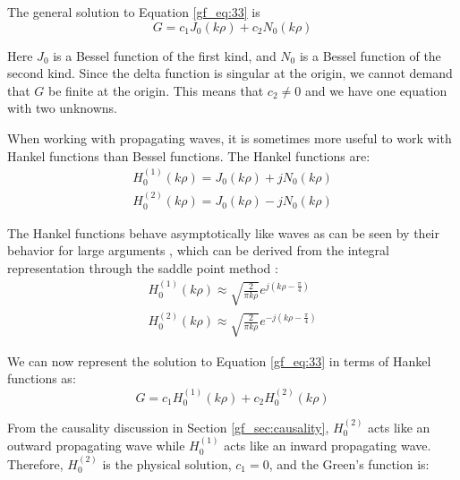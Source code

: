 \noindent The general solution to Equation \ref{gf_eq:33} is 
\begin{equation}
G = c_1J_0\left(k\rho\right) + c_2N_0\left(k\rho\right)
\label{gf_eq:35}
\end{equation}
\renewcommand{\baselinestretch}{2} \small\normalsize

Here $J_0$ is a Bessel function of the first kind, and $N_0$ is a Bessel function of the second kind. Since the delta function is singular at the origin, we cannot demand that $G$ be finite at the origin. This means that $c_2 \neq 0$ and we have one equation with two unknowns.

When working with propagating waves, it is sometimes more useful to work with Hankel functions than Bessel functions. The Hankel functions are:
\begin{equation}
\begin{gathered}
H_0^{(1)}(k\rho) = J_0(k\rho) + jN_0(k\rho) \\
H_0^{(2)}(k\rho) = J_0(k\rho) - jN_0(k\rho)
\label{gf_eq:36}
\end{gathered}
\end{equation}
\renewcommand{\baselinestretch}{2} \small\normalsize

The Hankel functions behave asymptotically like waves as can be seen by their behavior for large arguments \cite{abramowitz_stegun}, which can be derived from the integral representation through the saddle point method \cite{arfken_weber}:
\begin{equation}
\begin{gathered}
H_0^{(1)}(k\rho) \approx \sqrt{\frac{2}{\pi k\rho}}e^{j\left(k\rho - \frac{\pi}{4}\right)}\\
H_0^{(2)}(k\rho) \approx \sqrt{\frac{2}{\pi k\rho}}e^{-j\left(k\rho - \frac{\pi}{4}\right)}
\label{gf_eq:36a}
\end{gathered}
\end{equation}
\renewcommand{\baselinestretch}{2} \small\normalsize

We can now represent the solution to Equation \ref{gf_eq:33} in terms of Hankel functions as:
\begin{equation}
G = c_1H_0^{(1)}\left(k\rho\right) +c_2H_0^{(2)}\left(k\rho\right) 
\label{gf_eq:37}
\end{equation}
\renewcommand{\baselinestretch}{2} \small\normalsize

From the causality discussion in Section \ref{gf_sec:causality}, $H_0^{(2)}$ acts like an outward propagating wave while $H_0^{(1)}$ acts like an inward propagating wave. Therefore, $H_0^{(2)}$ is the physical solution, $c_1=0$, and the Green's function is:

